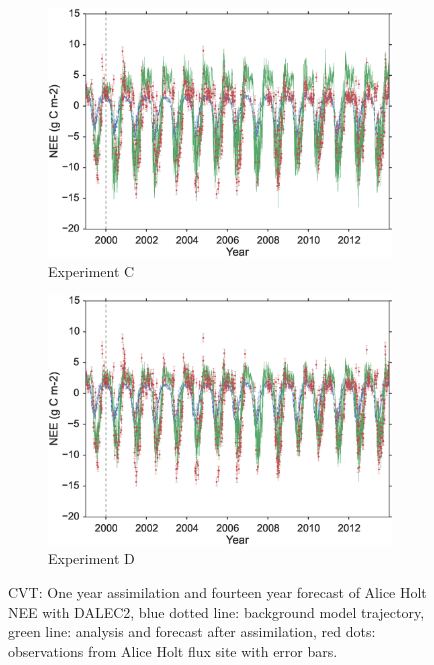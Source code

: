 \documentclass[11pt]{article}
\begin{document}
\begin{figure}
\begin{subfigure}[b]{0.49\textwidth}
        \includegraphics[width=\textwidth]{C4dvarcvt.eps}
        \caption{Experiment C}
        \label{fig:4dvarBcorR}
    \end{subfigure}
    \begin{subfigure}[b]{0.49\textwidth}
        \includegraphics[width=\textwidth]{D4dvarcvt.eps}
        \caption{Experiment D}
        \label{fig:4dvaredcBcorR}
    \end{subfigure}
    \caption{CVT: One year assimilation and fourteen year forecast of Alice Holt NEE with DALEC2, blue dotted line: background model trajectory, green line: analysis and forecast after assimilation, red dots: observations from Alice Holt flux site with error bars.}\label{fig:4dvar}
\end{figure}
\end{document}
